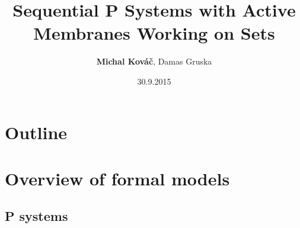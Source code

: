 \usepackage[utf8]{inputenc}
\usepackage{slovak}
\usepackage{tikz}
\usepackage{fancybox}
\usepackage{import}
\usepackage{forloop}
\usepackage{color,soul}
\usepackage{ifthen}
\makeatletter
\newcommand\SoulColor{%
  \let\set@color\beamerorig@set@color
  \let\reset@color\beamerorig@reset@color}
\newcommand\hlif[2]{%
  \ifthenelse{#1}{\SoulColor\hl{#2}}{#2}
}
\makeatother
\usepackage[english]{babel}
\usetikzlibrary{arrows,positioning}

\title{Sequential P Systems with Active Membranes Working on Sets}
\author{{\bf Michal Kováč}, Damas Gruska}
\date{30.9.2015}


\begin{frame}[t]
\titlepage
\end{frame}
\note{}

\section*{Outline}
\begin{frame}
\tableofcontents
\end{frame}
\note{}

\section{Overview of formal models} %
\label{sec:overview_of_formal_models}

  \subsection{P systems} %
  \label{sub:p_systems}

